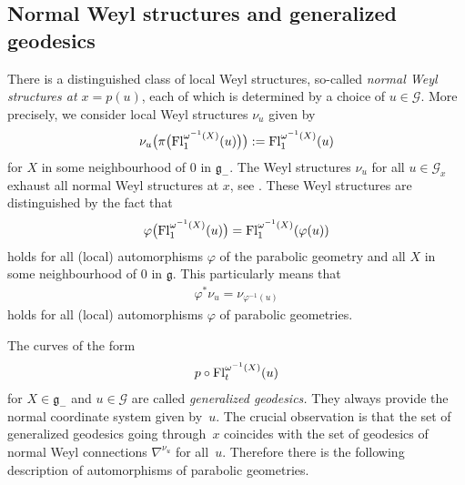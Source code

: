\documentclass[10pt,a4paper]{amsart}
\newcommand{\om}{\omega}
\newcommand{\ba}{\mathcal{G}}
\newcommand{\va}{\varphi}
\newcommand{\fg}{\mathfrak g}
\newcommand{\Fl}{{\rm Fl}}
\numberwithin{equation}{section}
\begin{document}
\subsection{Normal Weyl structures and generalized geodesics} There is a distinguished class of local Weyl structures, so-called \emph{normal Weyl structures at $x=p(u)$}, each of which is determined by a choice of $u\in \ba$.
More precisely, we consider local Weyl structures $\nu_u$ given by
\begin{gather*}\nu_u\big(\pi\big(\Fl_1^{\om^{-1}(X)}(u)\big)\big):=\Fl_1^{\om^{-1}(X)}(u)\end{gather*} for $X$ in some neighbourhood of $0$ in $\fg_-$. The Weyl structures $\nu_u$ for all $u\in \ba_x$ exhaust all normal Weyl structures at $x$, see \cite[Section~5.1.12]{parabook}.
These Weyl structures are distinguished by the fact that
\begin{gather}\label{autpos}
\va\big(\Fl^{\om^{-1}(X)}_1(u)\big)=\Fl^{\om^{-1}(X)}_1(\va(u))
\end{gather}
holds for all (local) automorphisms $\va$ of the parabolic geometry and all $X$ in some neighbourhood of $0$ in $\fg$. This particularly means that
\begin{gather*}\va^*\nu_u=\nu_{\va^{-1}(u)}\end{gather*}
holds for all (local) automorphisms $\va$ of parabolic geometries.

The curves of the form
\begin{gather*}p\circ \Fl_t^{\om^{-1}(X)}(u)\end{gather*}
for $X\in \fg_-$ and $u \in \ba$ are called \emph{generalized geodesics.} They always provide the normal coordinate system given by~$u$. The crucial observation is that the set of generalized geodesics going through~$x$ coincides with the set of geodesics of normal Weyl connections $\nabla^{\nu_u}$ for all~$u$. Therefore there is the following description of automorphisms of parabolic geometries.
\end{document}
